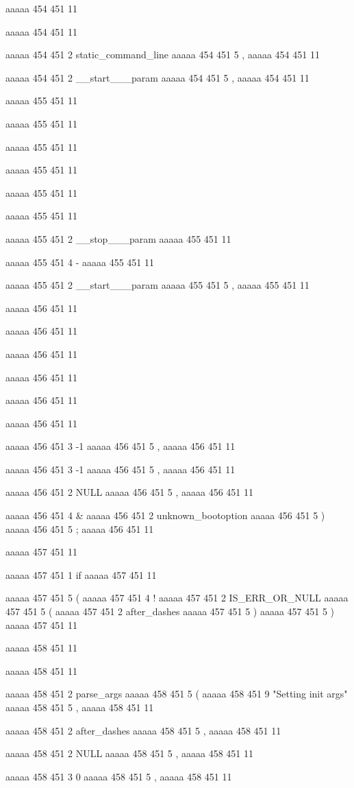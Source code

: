 {aaaaa 454 451
11
 
aaaaa 454 451
11
 
aaaaa 454 451
2
static_command_line
aaaaa 454 451
5
,
aaaaa 454 451
11
 
aaaaa 454 451
2
__start___param
aaaaa 454 451
5
,
aaaaa 454 451
11


aaaaa 455 451
11
	
aaaaa 455 451
11
	
aaaaa 455 451
11
	
aaaaa 455 451
11
	
aaaaa 455 451
11
 
aaaaa 455 451
11
 
aaaaa 455 451
2
__stop___param
aaaaa 455 451
11
 
aaaaa 455 451
4
-
aaaaa 455 451
11
 
aaaaa 455 451
2
__start___param
aaaaa 455 451
5
,
aaaaa 455 451
11


aaaaa 456 451
11
	
aaaaa 456 451
11
	
aaaaa 456 451
11
	
aaaaa 456 451
11
	
aaaaa 456 451
11
 
aaaaa 456 451
11
 
aaaaa 456 451
3
-1
aaaaa 456 451
5
,
aaaaa 456 451
11
 
aaaaa 456 451
3
-1
aaaaa 456 451
5
,
aaaaa 456 451
11
 
aaaaa 456 451
2
NULL
aaaaa 456 451
5
,
aaaaa 456 451
11
 
aaaaa 456 451
4
&
aaaaa 456 451
2
unknown_bootoption
aaaaa 456 451
5
)
aaaaa 456 451
5
;
aaaaa 456 451
11


aaaaa 457 451
11
	
aaaaa 457 451
1
if
aaaaa 457 451
11
 
aaaaa 457 451
5
(
aaaaa 457 451
4
!
aaaaa 457 451
2
IS_ERR_OR_NULL
aaaaa 457 451
5
(
aaaaa 457 451
2
after_dashes
aaaaa 457 451
5
)
aaaaa 457 451
5
)
aaaaa 457 451
11


aaaaa 458 451
11
	
aaaaa 458 451
11
	
aaaaa 458 451
2
parse_args
aaaaa 458 451
5
(
aaaaa 458 451
9
"Setting init args"
aaaaa 458 451
5
,
aaaaa 458 451
11
 
aaaaa 458 451
2
after_dashes
aaaaa 458 451
5
,
aaaaa 458 451
11
 
aaaaa 458 451
2
NULL
aaaaa 458 451
5
,
aaaaa 458 451
11
 
aaaaa 458 451
3
0
aaaaa 458 451
5
,
aaaaa 458 451
11
 
}
